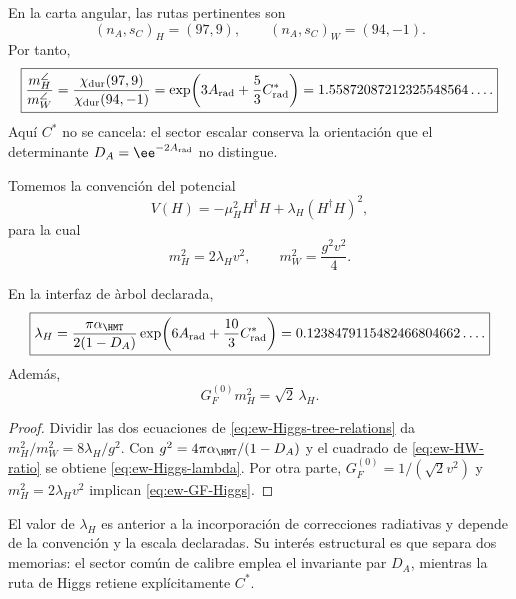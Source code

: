 En la carta angular, las rutas pertinentes son
\begin{equation}
\label{eq:ew-HW-signatures}
(n_A,s_C)_H=(97,9),
\qquad
(n_A,s_C)_W=(94,-1).
\end{equation}
Por tanto,
\begin{equation}
\label{eq:ew-HW-ratio}
\boxed{
\frac{m_H^{\angle}}{m_W^{\angle}}
=\frac{\chi_{\rm dur}(97,9)}{\chi_{\rm dur}(94,-1)}
=\exp\!\left(3A_{\rm rad}+\frac53C^*_{\rm rad}\right)
=1.55872087212325548564\ldots .}
\end{equation}
Aqu\'i \(C^*\) no se cancela: el sector escalar conserva la orientaci\'on
que el determinante \(D_A=\ee^{-2A_{\rm rad}}\) no distingue.

Tomemos la convenci\'on del potencial
\begin{equation}
\label{eq:ew-Higgs-potential}
V(H)=-\mu_H^2H^\dagger H
+\lambda_H(H^\dagger H)^2,
\end{equation}
para la cual
\begin{equation}
\label{eq:ew-Higgs-tree-relations}
m_H^2=2\lambda_Hv^2,
\qquad
m_W^2=\frac{g^2v^2}{4}.
\end{equation}

\begin{corollary}
\label{cor:ew-Higgs-lambda}
En la interfaz de \`arbol declarada,
\begin{equation}
\label{eq:ew-Higgs-lambda}
\boxed{
\lambda_H
=\frac{\pi\alpha_{\HMT}}{2(1-D_A)}
\exp\!\left(6A_{\rm rad}+\frac{10}{3}C^*_{\rm rad}\right)
=0.1238479115482466804662\ldots .}
\end{equation}
Adem\'as,
\begin{equation}
\label{eq:ew-GF-Higgs}
G_F^{(0)}m_H^2=\sqrt2\,\lambda_H.
\end{equation}
\end{corollary}

\begin{proof}
Dividir las dos ecuaciones de
\cref{eq:ew-Higgs-tree-relations} da
\(m_H^2/m_W^2=8\lambda_H/g^2\). Con
\(g^2=4\pi\alpha_{\HMT}/(1-D_A)\) y el cuadrado de
\cref{eq:ew-HW-ratio} se obtiene \cref{eq:ew-Higgs-lambda}. Por otra parte,
\(G_F^{(0)}=1/(\sqrt2v^2)\) y
\(m_H^2=2\lambda_Hv^2\) implican
\cref{eq:ew-GF-Higgs}.
\end{proof}

El valor de \(\lambda_H\) es anterior a la incorporaci\'on de correcciones
radiativas y depende de
la convenci\'on y la escala declaradas. Su inter\'es estructural es que
separa dos memorias: el sector com\'un de calibre emplea el invariante par \(D_A\),
mientras la ruta de Higgs retiene expl\'icitamente \(C^*\).

